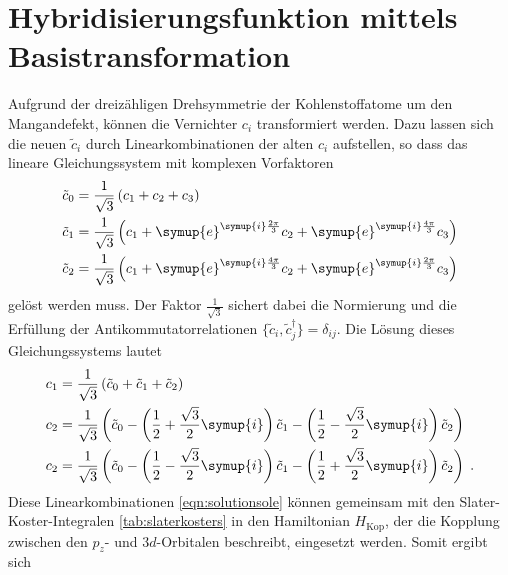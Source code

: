 \section{Hybridisierungsfunktion mittels Basistransformation}
Aufgrund der dreizähligen Drehsymmetrie der Kohlenstoffatome um den Mangandefekt, können die Vernichter $c_i$
transformiert werden.
Dazu lassen sich die neuen $\tilde{c}_i$ durch Linearkombinationen der alten $c_i$ aufstellen, so dass das lineare Gleichungssystem mit komplexen Vorfaktoren 
\begin{equation}
    \begin{aligned}
    \tilde{c}_0 &= \frac{1}{\sqrt{3}}\left (c_1 + c_2 + c_3 \right ) \\
    \tilde{c}_1 &= \frac{1}{\sqrt{3}}\left (c_1+ \symup{e}^{\symup{i}\frac{2\pi}{3}} c_2 + \symup{e}^{\symup{i}\frac{4\pi}{3}}c_3 \right ) \\
    \tilde{c}_2 &= \frac{1}{\sqrt{3}}\left (c_1 + \symup{e}^{\symup{i}\frac{4\pi}{3}} c_2 + \symup{e}^{\symup{i}\frac{2\pi}{3}}c_3 \right ) \label{eqn:sole} 
    \end{aligned}
\end{equation}
gelöst werden muss. 
Der Faktor $\frac{1}{\sqrt{3}}$ sichert dabei die Normierung und die Erfüllung der Antikommutatorrelationen $\{\tilde{c}_i,\tilde{c}^\dagger_j\} = \delta_{ij}$.
Die Lösung dieses Gleichungssystems lautet 
\begin{equation}
    \begin{aligned}
    c_1 &= \frac{1}{\sqrt{3}}\left (\tilde{c}_0 + \tilde{c}_1 + \tilde{c}_2 \right ) \\
    c_2 &= \frac{1}{\sqrt{3}}\left (\tilde{c}_0 - \left(\frac{1}{2} + \frac{{\sqrt{3}}}{2} \symup{i} \right) \tilde{c}_1 - \left ( \frac{1}{2} - \frac{{\sqrt{3}}}{2} \symup{i} \right ) \tilde{c}_2 \right ) \\
    c_2 &= \frac{1}{\sqrt{3}}\left (\tilde{c}_0 - \left(  \frac{1}{2} - \frac{{\sqrt{3}}}{2} \symup{i} \right) \tilde{c}_1 - \left ( \frac{1}{2} + \frac{{\sqrt{3}}}{2} \symup{i} \right ) \tilde{c}_2 \right ) 
    \; \text{.}   \label{eqn:solutionsole}
    \end{aligned}
\end{equation}
Diese Linearkombinationen \eqref{eqn:solutionsole} können gemeinsam mit den Slater-Koster-Integralen \ref{tab:slaterkosters} in den Hamiltonian $H_\text{Kop}$, der die Kopplung 
zwischen den $p_z$- und $3d$-Orbitalen beschreibt, eingesetzt werden.
Somit ergibt sich 
